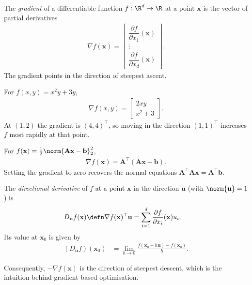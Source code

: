 \documentclass[a4paper, 12pt]{book}
\begin{document}
\begin{definition}
    The \emph{gradient} of a differentiable function $f : \R^d \to \R$ at a point $\mathbf{x}$ is the vector of partial derivatives
    \begin{align}
    \nabla f(\mathbf{x}) =
    \begin{bmatrix}
        \dfrac{\partial f}{\partial x_1}(\mathbf{x})\\
        \vdots\\
        \dfrac{\partial f}{\partial x_d}(\mathbf{x})
    \end{bmatrix}.
    \end{align}
    The gradient points in the direction of steepest ascent.
\end{definition}

\begin{example}
    For $f(x,y)=x^2y+3y$,
    \begin{align}
        \nabla f(x,y) = \begin{bmatrix}2xy\\ x^2+3\end{bmatrix}.
    \end{align}
    At $(1,2)$ the gradient is $(4,4)^\top$, so moving in the direction $(1,1)^\top$
    increases $f$ most rapidly at that point.
\end{example}

\begin{example}
    For $f(\mathbf{x})=\frac12\norm{\mathbf{A}\mathbf{x}-\mathbf{b}}_2^2$,
    \begin{align}
        \nabla f(\mathbf{x})
        = \mathbf{A}^\top(\mathbf{A}\mathbf{x}-\mathbf{b}).
    \end{align}
    Setting the gradient to zero recovers the normal equations
    $\mathbf{A}^\top\mathbf{A}\mathbf{x}=\mathbf{A}^\top\mathbf{b}$.
\end{example}

\begin{definition}
    The \emph{directional derivative} of $f$ at a point $\mathbf{x}$ in the direction $\mathbf{u}$ (with $\norm{\mathbf{u}}=1$) is
    \begin{align}
    D_{\mathbf{u}} f(\mathbf{x}) &\defn \nabla f(\mathbf{x})^\top \mathbf{u}
    = \sum_{i=1}^{d} \frac{\partial f}{\partial x_i}(\mathbf{x}) u_i.
    \end{align}
    Its value at $\mathbf{x}_0$ is given by
    \begin{align}
          (D_{\mathbf{u}} f)(\mathbf{x}_0)
          &= \lim_{h \to 0} \frac{f(\mathbf{x}_0 + h\mathbf{u}) - f(\mathbf{x}_0)}{h}.
    \end{align}
\end{definition}
Consequently, $-\nabla f(\mathbf{x})$ is the direction of steepest descent, which is
the intuition behind gradient-based optimisation.
\end{document}
